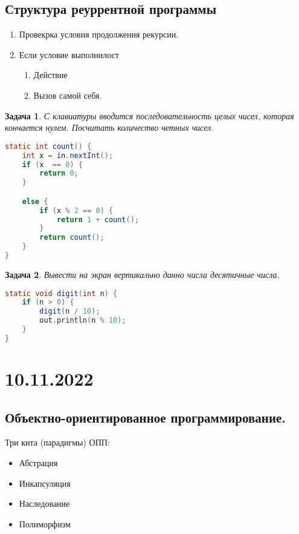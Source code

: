 \documentclass{scrartcl}
\newtheorem{task}{Задача}
\begin{document}
\subsection{Структура реуррентной программы}
\begin{enumerate}
    \item Провекрка условия продолжения рекурсии.
    \item  Если условие выполнилост
        \begin{enumerate}
            \item Действие
            \item Вызов самой себя.
        \end{enumerate}
\end{enumerate}
\begin{task}
    С клавиатуры вводится последовательность целых чисел, которая кончается нулем.
    Посчитать количество четных чисел.
\end{task}
\begin{lstlisting}[language=Java] 
static int count() {
    int x = in.nextInt();
    if (x  == 0) {
        return 0;
    }

    else {
        if (x % 2 == 0) {
            return 1 + count();
        }
        return count();
    }
}
\end{lstlisting} 
\begin{task}
    Вывести на экран вертикально данно числа десятичные числа.
\end{task}
\begin{lstlisting}[language=Java] 
static void digit(int n) {
    if (n > 0) {
        digit(n / 10);
        out.println(n % 10);
    }
}
\end{lstlisting} 
\section{10.11.2022}
\subsection{Объектно-ориентированное программирование.}
Три кита (парадигмы) ОПП:
\begin{itemize}
    \item Абстрация
    \item Инкапсуляция
    \item Наследование
    \item Полиморфизм
\end{itemize}
\end{document}

